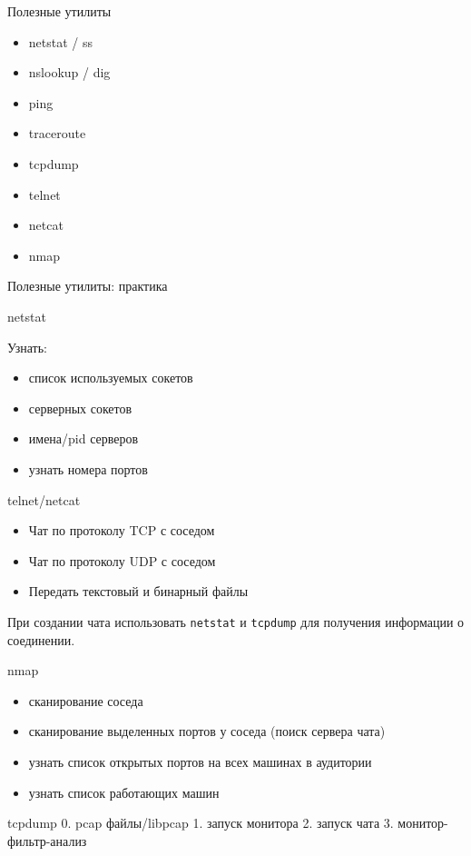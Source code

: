 \begin{frame}{Полезные утилиты}
	\begin{center}
		\begin{itemize}
			\item netstat / ss
			\item nslookup / dig
			\item ping
			\item traceroute
			\item tcpdump
			\item telnet
			\item netcat
			\item nmap
		\end{itemize}
	\end{center}

\end{frame}


\begin{frame}[allowframebreaks]{Полезные утилиты: практика}

		\begin{block}{netstat}

			Узнать:
			\begin{itemize}
				\item список используемых сокетов
				\item серверных сокетов
				\item имена/pid серверов
				\item узнать номера портов
			\end{itemize}
		\end{block}
	
		\framebreak
		\begin{block}{telnet/netcat}

			\begin{itemize}
				\item Чат по протоколу TCP с соседом
				\item Чат по протоколу UDP с соседом
				\item Передать текстовый и бинарный файлы
			\end{itemize}
	
			При создании чата использовать {\tt netstat} и {\tt tcpdump}
			для получения информации о соединении.
		\end{block}

		\framebreak
		\begin{block}{nmap}
			\begin{itemize}
				\item сканирование соседа
				\item сканирование выделенных портов у соседа (поиск сервера чата) 
				\item узнать список открытых портов на всех машинах в аудитории
				\item узнать список работающих машин
			\end{itemize}
		\end{block}
	
\end{frame}

tcpdump
0. pcap файлы/libpcap
1. запуск монитора
2. запуск чата
3. монитор-фильтр-анализ

